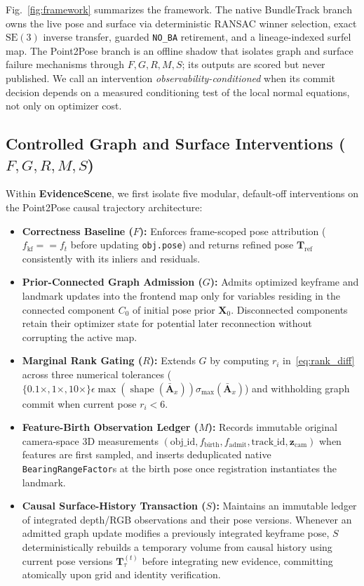 \documentclass[10pt,journal]{IEEEtran}
\begin{document}
Fig.~\ref{fig:framework} summarizes the framework. The native BundleTrack branch owns the live pose and surface via deterministic RANSAC winner selection, exact $\mathrm{SE}(3)$ inverse transfer, guarded \texttt{NO\_BA} retirement, and a lineage-indexed surfel map. The Point2Pose branch is an offline shadow that isolates graph and surface failure mechanisms through $F,G,R,M,S$; its outputs are scored but never published. We call an intervention \emph{observability-conditioned} when its commit decision depends on a measured conditioning test of the local normal equations, not only on optimizer cost.

\subsection{Controlled Graph and Surface Interventions ($F,G,R,M,S$)}
Within \textbf{EvidenceScene}, we first isolate five modular, default-off interventions on the Point2Pose causal trajectory architecture:
\begin{itemize}
    \item \textbf{Correctness Baseline ($F$):} Enforces frame-scoped pose attribution ($f_{\mathrm{kf}}==f_t$ before updating \texttt{obj.pose}) and returns refined pose $\mathbf{T}_{\mathrm{ref}}$ consistently with its inliers and residuals.
    \item \textbf{Prior-Connected Graph Admission ($G$):} Admits optimized keyframe and landmark updates into the frontend map only for variables residing in the connected component $C_0$ of initial pose prior $\mathbf{X}_0$. Disconnected components retain their optimizer state for potential later reconnection without corrupting the active map.
    \item \textbf{Marginal Rank Gating ($R$):} Extends $G$ by computing $r_i$ in~\eqref{eq:rank_diff} across three numerical tolerances ($\{0.1\times,1\times,10\times\}\epsilon\max(\operatorname{shape}(\bar{\mathbf{A}}_x))\sigma_{\max}(\bar{\mathbf{A}}_x)$) and withholding graph commit when current pose $r_i<6$.
    \item \textbf{Feature-Birth Observation Ledger ($M$):} Records immutable original camera-space 3D measurements $(\text{obj\_id},f_{\mathrm{birth}},f_{\mathrm{admit}},\text{track\_id},\mathbf{z}_{\mathrm{cam}})$ when features are first sampled, and inserts deduplicated native \texttt{BearingRangeFactor}s at the birth pose once registration instantiates the landmark.
    \item \textbf{Causal Surface-History Transaction ($S$):} Maintains an immutable ledger of integrated depth/RGB observations and their pose versions. Whenever an admitted graph update modifies a previously integrated keyframe pose, $S$ deterministically rebuilds a temporary volume from causal history using current pose versions $\mathbf{T}_\tau^{(t)}$ before integrating new evidence, committing atomically upon grid and identity verification.
\end{itemize}
\end{document}
